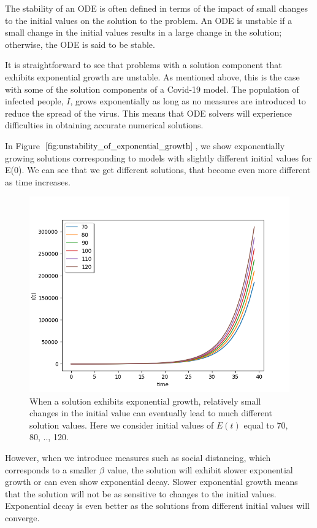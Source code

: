 The stability of an ODE is often defined in terms of the impact of small changes to the initial values on the solution to the problem. An ODE is unstable if a small change in the initial values results in a large change in the solution; otherwise, the ODE is said to be stable.

It is straightforward to see that problems with a solution component that exhibits exponential growth are unstable. As mentioned above, this is the case with some of the solution components of a Covid-19 model. The population of infected people, $I$, grows exponentially as long as no measures are introduced to reduce the spread of the virus. This means that ODE solvers will experience difficulties in obtaining accurate numerical solutions. 

In Figure $\ref{fig:unstability_of_exponential_growth}$, we show exponentially growing solutions corresponding to models with slightly different initial values for E(0). We can see that we get different solutions, that become even more different as time increases.

\begin{figure}[H]
\centering
\includegraphics[width=0.7\linewidth]{./figures/unstability_of_exponential_growth}
\caption{When a solution exhibits exponential growth, relatively small changes in the initial value can eventually lead to much different solution values. Here we consider initial values of $E(t)$ equal to 70, 80, .., 120.}
\label{fig:unstability_of_exponential_growth}
\end{figure}

However, when we introduce measures such as social distancing, which corresponds to a smaller $\beta$ value, the solution will exhibit slower exponential growth or can even show exponential decay. Slower exponential growth means that the solution will not be as sensitive to changes to the initial values. Exponential decay is even better as the solutions from different initial values will converge.


